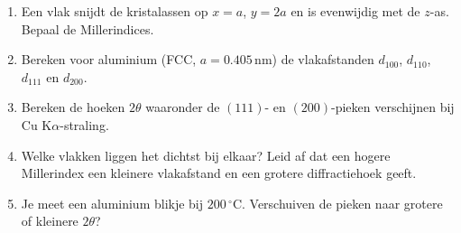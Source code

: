\begin{oefening}
\begin{enumerate}
\item[(a)]
  Een vlak snijdt de kristalassen op \(x = a\), \(y = 2a\) en is evenwijdig met de \(z\)-as. Bepaal de Millerindices.
\item[(b)]
  Bereken voor aluminium (FCC, \(a = 0.405\,\mathrm{nm}\)) de vlakafstanden \(d_{100}\), \(d_{110}\), \(d_{111}\) en \(d_{200}\).
\item[(c)]
  Bereken de hoeken \(2\theta\) waaronder de \((111)\)- en \((200)\)-pieken verschijnen bij Cu K\(\alpha\)-straling.
\item[(d)]
  Welke vlakken liggen het dichtst bij elkaar? Leid af dat een hogere Millerindex een kleinere vlakafstand en een grotere diffractiehoek geeft.
\item[(e)]
  Je meet een aluminium blikje bij \(200\,^\circ\mathrm{C}\). Verschuiven de pieken naar grotere of kleinere \(2\theta\)?
\end{enumerate}
\end{oefening}
